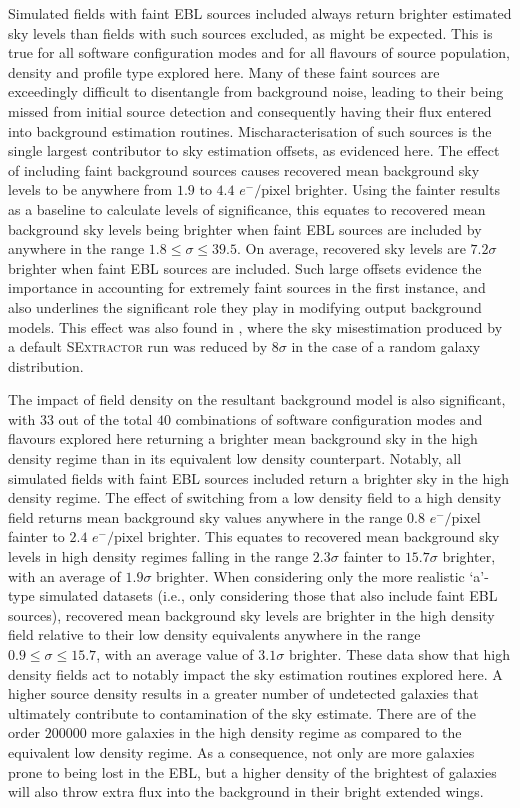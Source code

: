 \documentclass[fleqn,usenatbib,useAMS]{mnras}
\newcommand*{\SExtractor}{\textsc{SExtractor}\xspace}
\begin{document}
Simulated fields with faint EBL sources included always return brighter estimated sky levels than fields with such sources excluded, as might be expected. This is true for all software configuration modes and for all flavours of source population, density and profile type explored here. Many of these faint sources are exceedingly difficult to disentangle from background noise, leading to their being missed from initial source detection and consequently having their flux entered into background estimation routines. Mischaracterisation of such sources is the single largest contributor to sky estimation offsets, as evidenced here. The effect of including faint background sources causes recovered mean background sky levels to be anywhere from $1.9$ to $4.4$ $e^{-}/\textrm{pixel}$ brighter. Using the fainter results as a baseline to calculate levels of significance, this equates to recovered mean background sky levels being brighter when faint EBL sources are included by anywhere in the range $1.8\le\sigma\le39.5$. On average, recovered sky levels are $7.2\sigma$ brighter when faint EBL sources are included. Such large offsets evidence the importance in accounting for extremely faint sources in the first instance, and also underlines the significant role they play in modifying output background models. This effect was also found in \citet{Ji2018}, where the sky misestimation produced by a default \SExtractor run was reduced by $8\sigma$ in the case of a random galaxy distribution.

The impact of field density on the resultant background model is also significant, with $33$ out of the total $40$ combinations of software configuration modes and flavours explored here returning a brighter mean background sky in the high density regime than in its equivalent low density counterpart. Notably, all simulated fields with faint EBL sources included return a brighter sky in the high density regime. The effect of switching from a low density field to a high density field returns mean background sky values anywhere in the range $0.8$ $e^{-}/\textrm{pixel}$ fainter to $2.4$ $e^{-}/\textrm{pixel}$ brighter. This equates to recovered mean background sky levels in high density regimes falling in the range $2.3\sigma$ fainter to $15.7\sigma$ brighter, with an average of $1.9\sigma$ brighter. When considering only the more realistic `a'-type simulated datasets (i.e., only considering those that also include faint EBL sources), recovered mean background sky levels are brighter in the high density field relative to their low density equivalents anywhere in the range $0.9\le\sigma\le15.7$, with an average value of $3.1\sigma$ brighter. These data show that high density fields act to notably impact the sky estimation routines explored here. A higher source density results in a greater number of undetected galaxies that ultimately contribute to contamination of the sky estimate. There are of the order $200000$ more galaxies in the high density regime as compared to the equivalent low density regime. As a consequence, not only are more galaxies prone to being lost in the EBL, but a higher density of the brightest of galaxies will also throw extra flux into the background in their bright extended wings.
\end{document}
